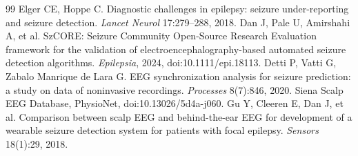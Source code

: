 \begin{thebibliography}{99}
 Elger CE, Hoppe C. Diagnostic challenges in epilepsy: seizure under-reporting and seizure detection. \emph{Lancet Neurol} 17:279--288, 2018.
 Dan J, Pale U, Amirshahi A, et al. SzCORE: Seizure Community Open-Source Research Evaluation framework for the validation of electroencephalography-based automated seizure detection algorithms. \emph{Epilepsia}, 2024, doi:10.1111/epi.18113.
 Detti P, Vatti G, Zabalo Manrique de Lara G. EEG synchronization analysis for seizure prediction: a study on data of noninvasive recordings. \emph{Processes} 8(7):846, 2020. Siena Scalp EEG Database, PhysioNet, doi:10.13026/5d4a-j060.
 Gu Y, Cleeren E, Dan J, et al. Comparison between scalp EEG and behind-the-ear EEG for development of a wearable seizure detection system for patients with focal epilepsy. \emph{Sensors} 18(1):29, 2018.

\end{thebibliography}
